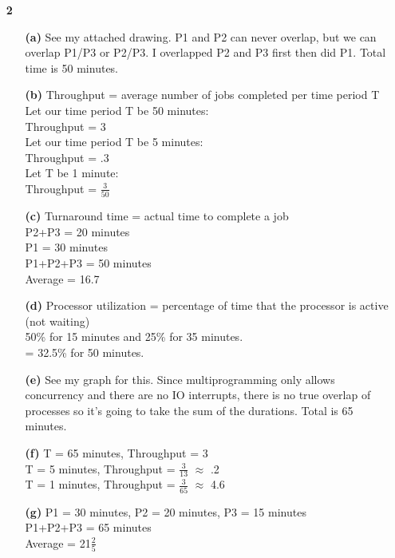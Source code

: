 \documentclass{article}
\begin{document}
\begin{enumerate}
\begin{enumerate}
  \end{enumerate}

\item[\textbf{2}]
 \begin{enumerate}
  \item[\textbf{(a)}]
   See my attached drawing. P1 and P2 can never overlap, but we can overlap
   P1/P3 or P2/P3. I overlapped P2 and P3 first then did P1. Total time is 50
   minutes.

  \item[\textbf{(b)}]
   Throughput = average number of jobs completed per time period T\\
   Let our time period T be 50 minutes:\\
   Throughput = 3\\
   Let our time period T be 5 minutes:\\
   Throughput = .3\\
   Let T be 1 minute:\\
   Throughput = $\frac{3}{50}$ 

  \item[\textbf{(c)}]
   Turnaround time = actual time to complete a job\\
   P2+P3 = 20 minutes\\
   P1 = 30 minutes\\
   P1+P2+P3 = 50 minutes\\
   Average = 16.7

  \item[\textbf{(d)}]
   Processor utilization = percentage of time that the processor is active (not
   waiting)\\
   50\% for 15 minutes and 25\% for 35 minutes.\\
   = 32.5\% for 50 minutes.

  \item[\textbf{(e)}]
   See my graph for this. Since multiprogramming only allows concurrency and
   there are no IO interrupts, there is no true overlap of processes so it's
   going to take the sum of the durations. Total is 65 minutes.

  \item[\textbf{(f)}]
   T = 65 minutes, Throughput = 3\\
   T = 5 minutes, Throughput = $\frac{3}{13}$ $\approx$ .2\\
   T = 1 minutes, Throughput = $\frac{3}{65}$ $\approx$ 4.6

  \item[\textbf{(g)}]
   P1 = 30 minutes, P2 = 20 minutes, P3 = 15 minutes \\
   P1+P2+P3 = 65 minutes \\
   Average = 21$\frac{2}{5}$


\end{enumerate}
\end{enumerate}
\end{document}
